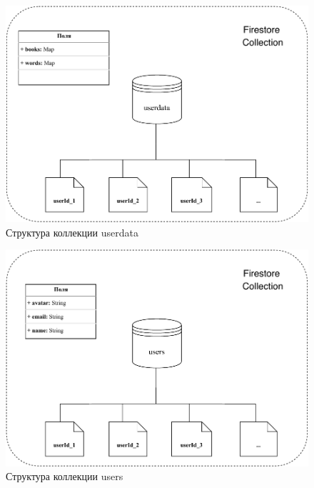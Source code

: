\begin{figure}[h]
	\centering
	\includegraphics[width=\textwidth, keepaspectratio]{figures/userdata}
	\caption{Структура коллекции userdata}
	\label{fig:userdataDiagram}
\end{figure}

\begin{figure}[h]
	\centering
	\includegraphics[width=\textwidth, keepaspectratio]{figures/users}
	\caption{Структура коллекции users}
	\label{fig:usersDiagram}
\end{figure}

